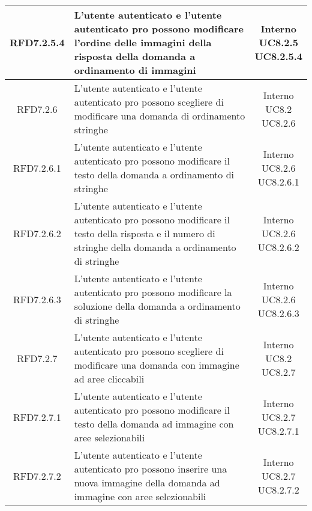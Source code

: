\begin{longtable}{|c|>{\centering}m{7cm}|c|}
			 \hypertarget{{RFD7.2.5.4}}{{RFD7.2.5.4}} & L’utente autenticato e l’utente
autenticato pro possono modificare
l’ordine delle immagini della risposta
della domanda a ordinamento di
immagini & \makecell{Interno\\ UC8.2.5 \\UC8.2.5.4 } \\ \hline
			 \hypertarget{{RFD7.2.6}}{{RFD7.2.6}} & L’utente autenticato e l’utente
autenticato pro possono scegliere di
modificare una domanda di ordinamento
stringhe & \makecell{Interno\\ UC8.2 \\UC8.2.6 } \\ \hline
			 \hypertarget{{RFD7.2.6.1}}{{RFD7.2.6.1}} & L’utente autenticato e l’utente
autenticato pro possono modificare il
testo della domanda a ordinamento di
stringhe & \makecell{Interno\\ UC8.2.6 \\UC8.2.6.1 } \\ \hline
			 \hypertarget{{RFD7.2.6.2}}{{RFD7.2.6.2}} & L’utente autenticato e l’utente
autenticato pro possono modificare il
testo della risposta e il numero di stringhe
della domanda a ordinamento di stringhe & \makecell{Interno\\ UC8.2.6 \\UC8.2.6.2 } \\ \hline
			 \hypertarget{{RFD7.2.6.3}}{{RFD7.2.6.3}} & L’utente autenticato e l’utente
autenticato pro possono modificare la
soluzione della domanda a ordinamento
di stringhe & \makecell{Interno\\ UC8.2.6 \\UC8.2.6.3 } \\ \hline
			 \hypertarget{{RFD7.2.7}}{{RFD7.2.7}} & L’utente autenticato e l’utente
autenticato pro possono scegliere di
modificare una domanda con immagine
ad aree cliccabili & \makecell{Interno\\ UC8.2 \\UC8.2.7 } \\ \hline
			 \hypertarget{{RFD7.2.7.1}}{{RFD7.2.7.1}} & L’utente autenticato e l’utente
autenticato pro possono modificare il
testo della domanda ad immagine con
aree selezionabili & \makecell{Interno\\ UC8.2.7 \\UC8.2.7.1 } \\ \hline
			 \hypertarget{{RFD7.2.7.2}}{{RFD7.2.7.2}} & L’utente autenticato e l’utente
autenticato pro possono inserire una
nuova immagine della domanda ad
immagine con aree selezionabili & \makecell{Interno\\ UC8.2.7 \\UC8.2.7.2 } \\ \hline

\end{longtable}
